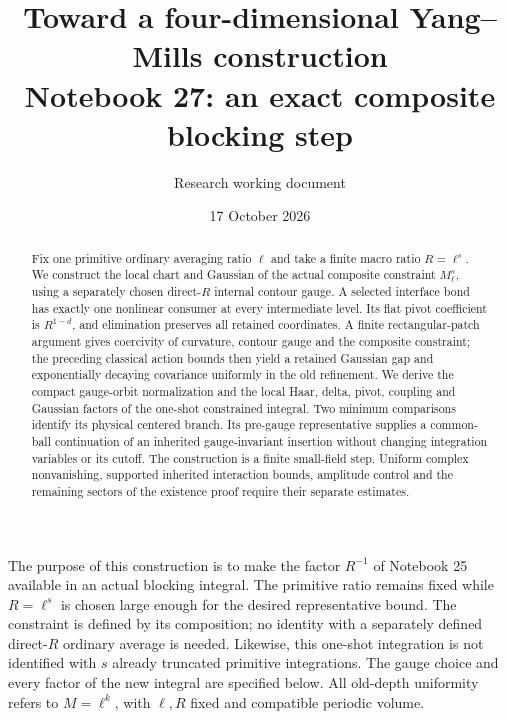 \documentclass[11pt]{article}
\title{Toward a four-dimensional Yang--Mills construction\\
\large Notebook 27: an exact composite blocking step}
\author{Research working document}
\date{17 October 2026}
\theoremstyle{remark}
\begin{document}
\maketitle
\begin{abstract}
Fix one primitive ordinary averaging ratio $\ell$ and take a finite
macro ratio $R=\ell^s$. We construct the local chart and Gaussian
of the actual composite constraint $M_\ell^s$, using a separately
chosen direct-$R$ internal contour gauge. A selected interface bond
has exactly one nonlinear consumer at every intermediate level.
Its flat pivot coefficient is $R^{1-d}$, and elimination preserves
all retained coordinates. A finite rectangular-patch argument gives
coercivity of curvature, contour gauge and the composite constraint;
the preceding classical action bounds then yield a retained Gaussian
gap and exponentially decaying covariance uniformly in the old
refinement. We derive the compact gauge-orbit normalization and the
local Haar, delta, pivot, coupling and Gaussian factors of the
one-shot constrained integral. Two minimum comparisons identify its
physical centered branch. Its pre-gauge representative supplies a
common-ball continuation of an inherited gauge-invariant insertion
without changing integration variables or its cutoff.
The construction is a finite small-field step. Uniform complex
nonvanishing, supported inherited interaction bounds, amplitude
control and the remaining sectors of the existence proof require
their separate estimates.
\end{abstract}

The purpose of this construction is to make the factor $R^{-1}$ of
Notebook 25 available in an actual blocking integral. The primitive
ratio remains fixed while $R=\ell^s$ is chosen large enough for the
desired representative bound. The constraint is defined by its
composition; no identity with a separately defined direct-$R$
ordinary average is needed. Likewise, this one-shot integration is
not identified with $s$ already truncated primitive integrations.
The gauge choice and every factor of the new integral are specified
below. All old-depth uniformity refers to $M=\ell^k$, with $\ell,R$
fixed and compatible periodic volume.
\end{document}
